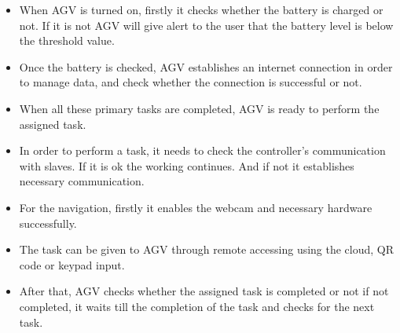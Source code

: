 \begin{itemize}
    \item  When AGV is turned on, firstly it checks whether the battery is charged or not. If it is not AGV will give alert to the user that the battery level is below the threshold value.
    \item Once the battery is checked, AGV establishes an internet connection in order to manage data, and check whether the connection is successful or not.
    \item When all these primary tasks are completed, AGV is ready to perform the assigned task.
    \item In order to perform a task, it needs to check the controller’s communication with slaves. If it is ok the working continues. And if not it establishes necessary communication.
    \item For the navigation, firstly it enables the webcam and necessary hardware successfully. 
    \item The task can be given to AGV through remote accessing using the cloud, QR code or keypad input.
    \item After that, AGV checks whether the assigned task is completed or not if not completed, it waits till the completion of the task and checks for the next task.
\end{itemize}


\newpage